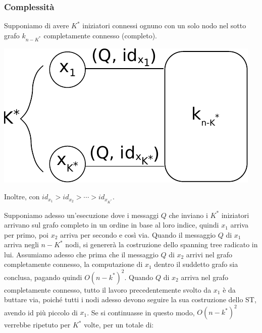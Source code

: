 \subsubsection{Complessità}
Supponiamo di avere $K^*$ iniziatori connessi ognuno con un solo nodo nel sotto
grafo $k_{n-K^*}$ completamente connesso (completo).
\begin{center}
    \includegraphics[scale=0.9]{capitoli/costruzione-spanning-tree/imgs/n_39}
\end{center}
Inoltre, con $id_{x_1} > id_{x_2} > \cdots > id_{x_{K^*}}$.

Supponiamo adesso un'esecuzione dove i messaggi $Q$ che inviano i $K^*$ iniziatori
arrivano sul grafo completo in un ordine in base al loro indice, quindi $x_1$
arriva per primo, poi $x_2$ arriva per secondo e così via. Quando il messaggio
$Q$ di $x_1$ arriva negli $n-K^*$ nodi, si genererà la costruzione dello
spanning tree radicato in lui. Assumiamo adesso che prima che il messaggio $Q$
di $x_2$ arrivi nel grafo completamente connesso, la computazione di $x_1$
dentro il suddetto grafo sia conclusa, pagando quindi $O(n-k^*)^2$. Quando $Q$
di $x_2$ arriva nel grafo completamente connesso, tutto il lavoro
precedentemente svolto da $x_1$ è da buttare via, poiché tutti i nodi adesso
devono seguire la sua costruzione dello ST, avendo id più piccolo di $x_1$. Se
si continuasse in questo modo, $O(n-k^*)^2$ verrebbe ripetuto per $K^*$ volte,
per un totale di:


